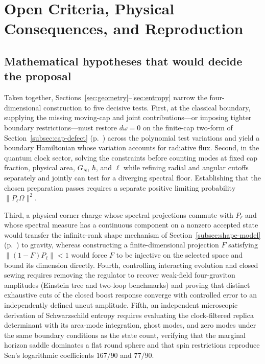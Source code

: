 \documentclass[10pt,a4paper]{article}
\begin{document}
\clearpage
\section[Open Criteria and Reproduction]{Open Criteria, Physical Consequences, and Reproduction}
\label{sec:conclusions}

\subsection{Mathematical hypotheses that would decide the proposal}
Taken together, Sections~\ref{sec:geometry}--\ref{sec:entropy} narrow the four-dimensional construction to five decisive tests. First, at the classical boundary, supplying the missing moving-cap and joint contributions---or imposing tighter boundary restrictions---must restore $d\omega = 0$ on the finite-cap two-form of Section~\ref{subsec:cap-defect} (p.~\pageref{subsec:cap-defect}) across the polynomial test variations and yield a boundary Hamiltonian whose variation accounts for radiative flux. Second, in the quantum clock sector, solving the constraints before counting modes at fixed cap fraction, physical area, $G_N$, $\hbar$, and $\ell$ while refining radial and angular cutoffs separately and jointly can test for a diverging spectral floor. Establishing that the chosen preparation passes requires a separate positive limiting probability $\|P_\ell\Omega\|^2$.

Third, a physical corner charge whose spectral projections commute with $P_\ell$ and whose spectral measure has a continuous component on a nonzero accepted state would transfer the infinite-rank shape mechanism of Section~\ref{subsec:shape-model} (p.~\pageref{subsec:shape-model}) to gravity, whereas constructing a finite-dimensional projection $F$ satisfying $\|(1-F)P_\ell\| < 1$ would force $F$ to be injective on the selected space and bound its dimension directly. Fourth, controlling interacting evolution and closed sewing requires removing the regulator to recover weak-field four-graviton amplitudes (Einstein tree and two-loop benchmarks) and proving that distinct exhaustive cuts of the closed boost response converge with controlled error to an independently defined uncut amplitude. Fifth, an independent microscopic derivation of Schwarzschild entropy requires evaluating the clock-filtered replica determinant with its area-mode integration, ghost modes, and zero modes under the same boundary conditions as the state count, verifying that the marginal horizon saddle dominates a flat round sphere and that spin restrictions reproduce Sen's logarithmic coefficients $167/90$ and $77/90$.
\end{document}
